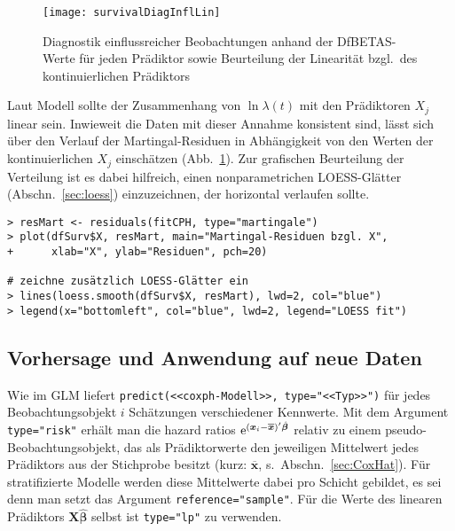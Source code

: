 \begin{figure}[ht]
\centering
\texttt{[image: survivalDiagInflLin]}
\vspace*{-0.5em}
\caption{Diagnostik einflussreicher Beobachtungen anhand der DfBETAS-Werte für jeden Prädiktor sowie Beurteilung der Linearität bzgl.\ des kontinuierlichen Prädiktors}
\label{fig:survivalDiagInflLin}
\end{figure}

Laut Modell sollte der Zusammenhang von $\ln \lambda(t)$ mit den Prädiktoren $X_{j}$ linear sein. Inwieweit die Daten mit dieser Annahme konsistent sind, lässt sich über den Verlauf der Martingal-Residuen in Abhängigkeit von den Werten der kontinuierlichen $X_{j}$ einschätzen (Abb.\ \ref{fig:survivalDiagInflLin}). Zur grafischen Beurteilung der Verteilung ist es dabei hilfreich, einen nonparametrichen LOESS-Glätter (Abschn.\ \ref{sec:loess}) einzuzeichnen, der horizontal verlaufen sollte.
\begin{lstlisting}
> resMart <- residuals(fitCPH, type="martingale")
> plot(dfSurv$X, resMart, main="Martingal-Residuen bzgl. X",
+      xlab="X", ylab="Residuen", pch=20)

# zeichne zusätzlich LOESS-Glätter ein
> lines(loess.smooth(dfSurv$X, resMart), lwd=2, col="blue")
> legend(x="bottomleft", col="blue", lwd=2, legend="LOESS fit")
\end{lstlisting}

\subsection{Vorhersage und Anwendung auf neue Daten}
\label{sec:survPredict}

Wie im GLM liefert \lstinline!predict(<<coxph-Modell>>, type="<<Typ>>")! für jedes Beobachtungsobjekt $i$ Schätzungen verschiedener Kennwerte. Mit dem Argument \lstinline!type="risk"! erhält man die hazard ratios ${\mathrm{e}}^{(\bm{x}_{i} - \overline{\bm{x}})' \hat{\bm{\beta}}}$ relativ zu einem pseudo-Beobachtungsobjekt, das als Prädiktorwerte den jeweiligen Mittelwert jedes Prädiktors aus der Stichprobe besitzt (kurz: $\overline{\bm{x}}$, s.\ Abschn.\ \ref{sec:CoxHat}). Für stratifizierte Modelle werden diese Mittelwerte dabei pro Schicht gebildet, es sei denn man setzt das Argument \lstinline!reference="sample"!. Für die Werte des linearen Prädiktors $\bm{X} \hat{\bm{\beta}}$ selbst ist \lstinline!type="lp"! zu verwenden.

